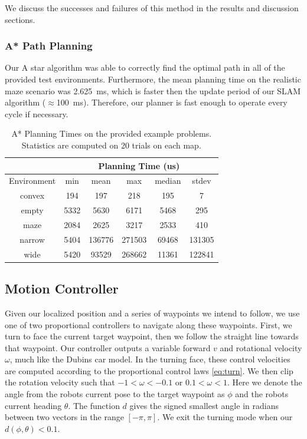 \documentclass[journal]{IEEEtran}
\begin{document}
We discuss the successes and failures of this method in the results and discussion sections.

\subsubsection{A* Path Planning}

Our A star algorithm was able to correctly find the optimal path in all of the provided test environments. Furthermore, the mean planning time on the realistic maze scenario was \SI{2.625}{\milli\second}, which is faster then the update period of our SLAM algorithm ($\approx$\SI{100}{\milli\second}). Therefore, our planner is fast enough to operate every cycle if necessary.

\begin{table}
    \centering
    \begin{tabular}{|c|c|c|c|c|c|} \hline
        & \multicolumn{5}{c|}{Planning Time (us)} \\ \hline
        Environment & min & mean & max & median & stdev \\ \hline
        convex & 194 & 197 & 218 & 195 & 7 \\ \hline
        empty & 5332 & 5630 & 6171 & 5468 & 295 \\ \hline
        maze & 2084 & 2625 & 3217 & 2533 & 410 \\ \hline
        narrow & 5404 & 136776 & 271503 & 69468 & 131305 \\ \hline
        wide & 5420 & 93529 & 268662 & 11361 & 122841 \\ \hline
    \end{tabular}
    \caption{A* Planning Times on the provided example problems. Statistics are computed on 20 trials on each map.}
    \label{tab:a_star_times}
\end{table}


\subsection{Motion Controller}

Given our localized position and a series of waypoints we intend to follow, we use one of two proportional controllers to navigate along these waypoints. First, we turn to face the current target waypoint, then we follow the straight line towards that waypoint. Our controller outputs a variable forward $v$ and rotational velocity $\omega$, much like the Dubins car model. In the turning face, these control velocities are computed according to the proportional control laws \eqref{eq:turn}. We then clip the rotation velocity such that $-1 < \omega < -0.1$ or $0.1 < \omega < 1$. Here we denote the angle from the robots current pose to the target waypoint as $\phi$ and the robots current heading $\theta$. The function $d$ gives the signed smallest angle in radians between two vectors in the range $[-\pi,\pi]$. We exit the turning mode when our $d(\phi,\theta) < 0.1$.
\end{document}
